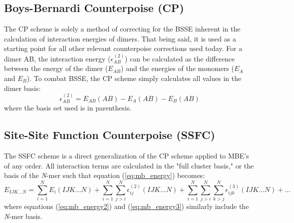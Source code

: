 \documentclass[a4paper,12pt]{article}
\begin{document}
    \subsection{Boys-Bernardi Counterpoise (CP)\cite{Boys1970}}
        The CP scheme is solely a method of correcting for the BSSE inherent in the calculation of interaction energies of dimers. That being said, it is used as a starting point for all other relevant counterpoise corrections used today. For a dimer AB, the interaction energy ($\epsilon_{AB}^{(2)}$) can be calculated as the difference between the energy of the dimer ($E_{AB}$) and the energies of the monomers ($E_A$ and $E_B$). To combat BSSE, the CP scheme simply calculates all values in the dimer basis:
        \begin{equation} \label{eq:cp}
            \epsilon_{AB}^{(2)} = E_{AB}(AB) - E_{A}(AB) - E_{B}(AB)
        \end{equation}
        where the basis set used is in parenthesis. 

    \subsection{Site-Site Function Counterpoise (SSFC)\cite{Wells1983}}
        The SSFC scheme is a direct generalization of the CP scheme applied to MBE's of any order. All interaction terms are calculated in the "full cluster basis," or the basis of the \textit{N}-mer such that equation (\ref{eq:mb_energy}) becomes:
        \begin{equation} \label{eq:SSFC_many-body}
            E_{IJK...N} = \sum_{i=1}^{N}E_{i}(IJK...N) + \sum_{i=1}^{N}\sum_{j>i}^{N}\epsilon_{ij}^{(2)}(IJK...N) + \sum_{i=1}^{N}\sum_{j>i}^{N}\sum_{k>j}^{N}\epsilon_{ijk}^{(3)}(IJK...N) + ...
        \end{equation} 
    where equations (\ref{eq:mb_energy2}) and (\ref{eq:mb_energy3}) similarly include the \textit{N}-mer basis.
\end{document}
